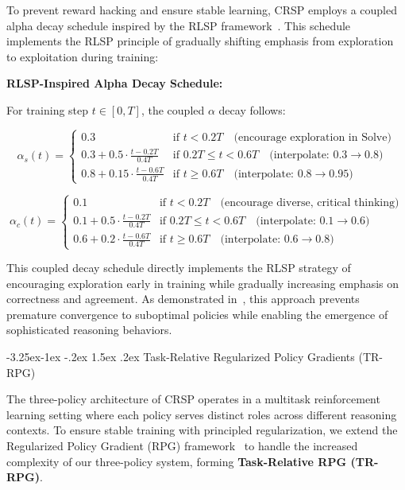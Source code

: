 \documentclass[10pt,a4paper]{article}
\makeatletter
\renewcommand\subsection{\@startsection{subsection}{2}{\z@}%
  {-3.25ex\@plus -1ex \@minus -.2ex}%
  {1.5ex \@plus .2ex}%
  {\fontfamily{sourcecodepro}\selectfont\large\bfseries}}
\makeatother
\begin{document}
To prevent reward hacking and ensure stable learning, CRSP employs a coupled alpha decay schedule inspired by the RLSP framework~\cite{ye2025emergence}. This schedule implements the RLSP principle of gradually shifting emphasis from exploration to exploitation during training:

\textbf{RLSP-Inspired Alpha Decay Schedule:}

For training step $t \in [0, T]$, the coupled $\alpha$ decay follows:

\begin{equation}
\alpha_s(t) = \begin{cases}
0.3 & \text{if } t < 0.2T \quad \text{(encourage exploration in Solve)} \\
0.3 + 0.5 \cdot \frac{t - 0.2T}{0.4T} & \text{if } 0.2T \leq t < 0.6T \quad \text{(interpolate: } 0.3 \rightarrow 0.8\text{)} \\
0.8 + 0.15 \cdot \frac{t - 0.6T}{0.4T} & \text{if } t \geq 0.6T \quad \text{(interpolate: } 0.8 \rightarrow 0.95\text{)}
\end{cases}
\end{equation}

\begin{equation}
\alpha_c(t) = \begin{cases}
0.1 & \text{if } t < 0.2T \quad \text{(encourage diverse, critical thinking)} \\
0.1 + 0.5 \cdot \frac{t - 0.2T}{0.4T} & \text{if } 0.2T \leq t < 0.6T \quad \text{(interpolate: } 0.1 \rightarrow 0.6\text{)} \\
0.6 + 0.2 \cdot \frac{t - 0.6T}{0.4T} & \text{if } t \geq 0.6T \quad \text{(interpolate: } 0.6 \rightarrow 0.8\text{)}
\end{cases}
\end{equation}

This coupled decay schedule directly implements the RLSP strategy of encouraging exploration early in training while gradually increasing emphasis on correctness and agreement. As demonstrated in~\cite{ye2025emergence}, this approach prevents premature convergence to suboptimal policies while enabling the emergence of sophisticated reasoning behaviors.

\subsection{Task-Relative Regularized Policy Gradients (TR-RPG)}

The three-policy architecture of CRSP operates in a multitask reinforcement learning setting where each policy serves distinct roles across different reasoning contexts. To ensure stable training with principled regularization, we extend the Regularized Policy Gradient (RPG) framework~\cite{zhang2025rpg} to handle the increased complexity of our three-policy system, forming \textbf{Task-Relative RPG (TR-RPG)}.
\end{document}
